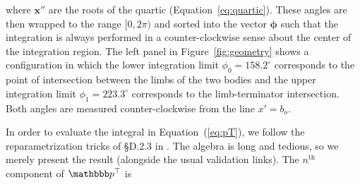 \documentclass[modern]{aastex62}
\begin{document}
%
where $\mathbf{x''}$ are the roots of the quartic (Equation~\ref{eq:quartic}).
These angles are then wrapped to the range $[0, 2\pi)$
and sorted into the vector $\pmb{\phi}$ such that
the integration is always performed in a counter-clockwise sense about
the center of the integration region.
%
The left panel in Figure~\ref{fig:geometry} shows a configuration in which
the lower integration limit $\phi_0 = 158.2^\circ$ corresponds to the
point of intersection between the limbs of the two bodies and the upper
integration limit $\phi_1 = 223.3^\circ$ corresponds to the
limb-terminator intersection. Both angles are measured counter-clockwise
from the line $x' = b_o$.

In order to evaluate the integral in Equation~(\ref{eq:pT}),
we follow the reparametrization tricks of \S{D.2.3} in \citet{Luger2019}.
The algebra is long and tedious, so we merely present the result
(alongside the usual validation links). The $n^\text{th}$ component
of $\pT$ is
%
\end{document}

